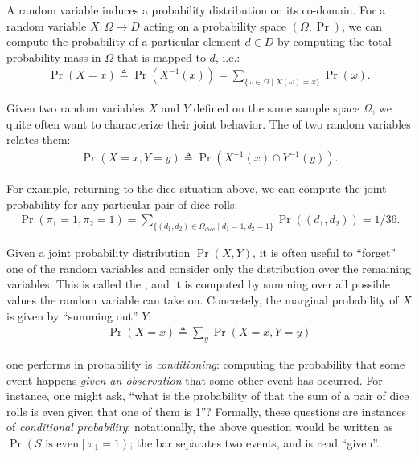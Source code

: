 \documentclass{tufte-handout}
\begin{document}
A random variable induces a probability distribution on its co-domain. For a
random variable $X : \Omega \rightarrow D$ acting on a probability space
$(\Omega, \Pr)$, we can compute the probability of a particular element $d \in
D$ by computing the total probability mass in $\Omega$ that is mapped to $d$,
i.e.:
\begin{align}
    \Pr(X = x) \triangleq \Pr(X^{-1}(x)) = \sum_{\{\omega \in \Omega \mid X(\omega) = x\}} \Pr(\omega).
\end{align}

Given two random variables $X$ and $Y$ defined on the same sample space
$\Omega$, we quite often want to characterize their joint behavior. The 
 of two random variables relates them:
\begin{align}
    \Pr(X=x, Y=y) \triangleq \Pr(X^{-1}(x) \cap Y^{-1}(y)).
\end{align}


For example, returning to the dice situation above, we can compute the 
joint probability for any particular pair of dice rolls:
\begin{align*}
    \Pr(\pi_1 = 1, \pi_2 = 1) = \sum_{\{(d_1, d_2) \in \Omega_{dice} \mid d_1 = 1, d_2 = 1 \}} \Pr((d_1, d_2)) = 1/36.
\end{align*}

Given a joint probability distribution $\Pr(X, Y)$, it is often useful to ``forget'' 
one of the random variables and consider only the distribution over the remaining 
variables. This is called the , and it is computed by summing 
over all possible values the random variable can take on. Concretely, the
marginal probability of $X$ is given by ``summing out'' $Y$:
\begin{align}
    \Pr(X = x) \triangleq \sum_{y} \Pr(X=x, Y=y)
    \label{eq:marg}
\end{align}

 one performs in probability is
\emph{conditioning}: computing the probability that some event happens
\emph{given an observation} that some other event has occurred. For instance,
one might ask, ``what is the probability of that the sum of a pair of dice rolls
is even given that one of them is 1''? Formally, these questions are instances
of \emph{conditional probability}; notationally, the above question would be 
written as $\Pr( S \text { is even} \mid \pi_1 = 1)$; the bar separates two
events, and is read ``given''.
\end{document}
